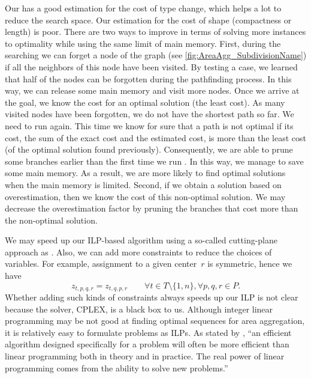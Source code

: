 \documentclass[acmsmall,natbib=false]{acmart}
\begin{document}
Our \Astar has a good estimation for the cost of type 
change, which helps a lot to reduce the search space. 
Our estimation for the cost of shape 
(compactness or length) is poor.
There are two ways to improve \Astar
in terms of solving more instances to optimality 
while using the same limit of main memory.
First, during the searching we can forget a node of the graph
(see \fig\ref{fig:AreaAgg_SubdivisionName})
if all the neighbors of this node have been visited.
By testing a case, we learned that half of the nodes can be 
forgotten during the pathfinding process.
In this way, we can release some main memory 
and visit more nodes.
Once we arrive at the goal, 
we know the cost for 
an optimal solution (the least cost).
As many visited nodes have been forgotten, 
we do not have the shortest path so far.
We need to run \Astar again.
This time we know for sure that 
a path is not optimal if its cost, 
the sum of the exact cost and the estimated cost, 
is more than the least cost 
(of the optimal solution found previously).
Consequently, we are able to prune some branches earlier 
than the first time we run \Astar.
In this way, we manage to save some main memory.
As a result, we are more likely to find optimal solutions
when the main memory is limited.
Second, if we obtain a solution based on overestimation, 
then we know the cost of this non-optimal solution.
We may decrease the overestimation factor by pruning the branches
that cost more than the non-optimal solution.


We may speed up our ILP-based algorithm using a so-called 
cutting-plane approach as \textcite{Oehrlein2017Aggregation}.
Also, we can add more constraints to
reduce the choices of variables.
For example, assignment to a given center~$r$ is symmetric, 
hence we have
\begin{equation*}
\label{eq:CstrZX}
z_{t,p,q,r}= z_{t,q,p,r} \qquad
\forall t \in {T} \setminus \{1,n\}, 
\forall p, q, r \in P.
\end{equation*}
Whether adding such kinds of constraints always
speeds up our ILP is not clear
because the solver, CPLEX, is a black box to us.
Although integer linear programming may be not good at 
finding optimal sequences for area aggregation,
it is relatively easy to formulate problems as ILPs.
As stated by \citet[p.~861]{Cormen2009}, 
``an efficient algorithm designed specifically for a problem 
will often be more efficient than 
linear programming both in theory and in practice. 
The real power of linear programming comes from 
the ability to solve new problems.''
\end{document}
